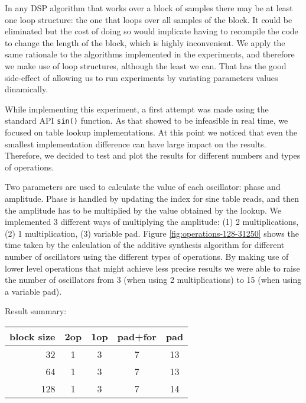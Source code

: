

In any DSP algorithm that works over a block of samples there may be at least
one loop structure: the one that loops over all samples of the block. It could
be eliminated but the cost of doing so would implicate having to recompile the
code to change the length of the block, which is highly inconvenient. We apply
the same rationale to the algorithms implemented in the experiments, and
therefore we make use of loop structures, although the least we can. That has
the good side-effect of allowing us to run experiments by variating parameters
values dinamically.

While implementing this experiment, a first attempt was made using the
standard API \texttt{sin()} function. As that showed to be infeasible in real
time, we focused on table lookup implementations. At this point we noticed
that even the smallest implementation difference can have large impact on the
results. Therefore, we decided to test and plot the results for different
numbers and types of operations.

Two parameters are used to calculate the value of each oscillator: phase and
amplitude. Phase is handled by updating the index for sine table reads, and
then the amplitude has to be multiplied by the value obtained by the lookup.
We implemented 3 different ways of multiplying the amplitude: (1) 2
multiplications, (2) 1 multiplication, (3) variable pad.
Figure \ref{fig:operations-128-31250} shows the time taken by the calculation
of the additive synthesis algorithm for different number of oscillators using
the different types of operations. By making use of lower level operations
that might achieve less precise results we were able to raise the number of
oscillators from 3 (when using 2 multiplications) to 15 (when using a variable
pad).





Result summary:

\begin{center}
\begin{tabular}{rcccc}
\toprule
\toprule
block size  & 2op & 1op & pad+for & pad \\
\midrule
32  & 1 & 3 & 7 & 13 \\
64  & 1 & 3 & 7 & 13 \\
128 & 1 & 3 & 7 & 14 \\
\bottomrule
\end{tabular}
\end{center}


